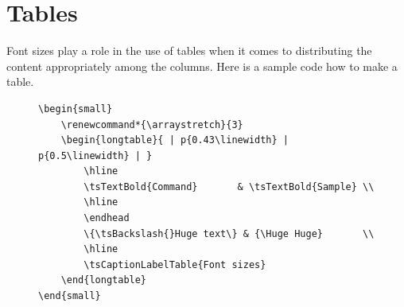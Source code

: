 
\section{Tables}

Font sizes play a role in the use of tables when it comes to distributing
the content appropriately among the columns. Here is a sample code how to
make a table.

\begin{figure}[H]
    \small
    \centering
    \begin{BVerbatim}
\begin{small}
    \renewcommand*{\arraystretch}{3}
    \begin{longtable}{ | p{0.43\linewidth} | p{0.5\linewidth} | }
        \hline
        \tsTextBold{Command}       & \tsTextBold{Sample} \\
        \hline
        \endhead
        \{\tsBackslash{}Huge text\} & {\Huge Huge}       \\
        \hline
        \tsCaptionLabelTable{Font sizes}
    \end{longtable}
\end{small}
    \end{BVerbatim}
\end{figure}

